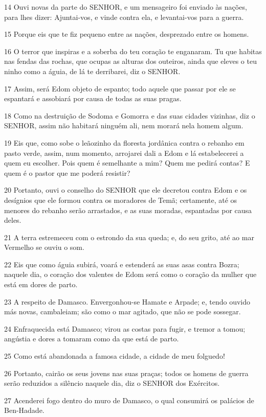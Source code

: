 \par 14 Ouvi novas da parte do SENHOR, e um mensageiro foi enviado às nações, para lhes dizer: Ajuntai-vos, e vinde contra ela, e levantai-vos para a guerra.
\par 15 Porque eis que te fiz pequeno entre as nações, desprezado entre os homens.
\par 16 O terror que inspiras e a soberba do teu coração te enganaram. Tu que habitas nas fendas das rochas, que ocupas as alturas dos outeiros, ainda que eleves o teu ninho como a águia, de lá te derribarei, diz o SENHOR.
\par 17 Assim, será Edom objeto de espanto; todo aquele que passar por ele se espantará e assobiará por causa de todas as suas pragas.
\par 18 Como na destruição de Sodoma e Gomorra e das suas cidades vizinhas, diz o SENHOR, assim não habitará ninguém ali, nem morará nela homem algum.
\par 19 Eis que, como sobe o leãozinho da floresta jordânica contra o rebanho em pasto verde, assim, num momento, arrojarei dali a Edom e lá estabelecerei a quem eu escolher. Pois quem é semelhante a mim? Quem me pedirá contas? E quem é o pastor que me poderá resistir?
\par 20 Portanto, ouvi o conselho do SENHOR que ele decretou contra Edom e os desígnios que ele formou contra os moradores de Temã; certamente, até os menores do rebanho serão arrastados, e as suas moradas, espantadas por causa deles.
\par 21 A terra estremeceu com o estrondo da sua queda; e, do seu grito, até ao mar Vermelho se ouviu o som.
\par 22 Eis que como águia subirá, voará e estenderá as suas asas contra Bozra; naquele dia, o coração dos valentes de Edom será como o coração da mulher que está em dores de parto.
\par 23 A respeito de Damasco. Envergonhou-se Hamate e Arpade; e, tendo ouvido más novas, cambaleiam; são como o mar agitado, que não se pode sossegar.
\par 24 Enfraquecida está Damasco; virou as costas para fugir, e tremor a tomou; angústia e dores a tomaram como da que está de parto.
\par 25 Como está abandonada a famosa cidade, a cidade de meu folguedo!
\par 26 Portanto, cairão os seus jovens nas suas praças; todos os homens de guerra serão reduzidos a silêncio naquele dia, diz o SENHOR dos Exércitos.
\par 27 Acenderei fogo dentro do muro de Damasco, o qual consumirá os palácios de Ben-Hadade.
